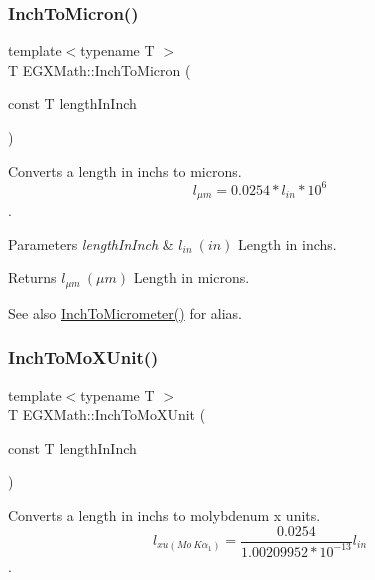 \subsubsection{\texorpdfstring{Inch\+To\+Micron()}{InchToMicron()}}
{\footnotesize\ttfamily template$<$typename T $>$ \\
T E\+G\+X\+Math\+::\+Inch\+To\+Micron (\begin{DoxyParamCaption}\item[{const T}]{length\+In\+Inch }\end{DoxyParamCaption})}



Converts a length in inchs to microns. \[ l_{\mu m}=0.0254 * l_{in} * 10^{6} \]. 


\begin{DoxyParams}{Parameters}
{\em length\+In\+Inch} & $ l_{in}\ (in)$ Length in inchs. \\
\hline
\end{DoxyParams}
\begin{DoxyReturn}{Returns}
$ l_{\mu m}\ (\mu m)$ Length in microns. 
\end{DoxyReturn}
\begin{DoxySeeAlso}{See also}
\mbox{\hyperlink{group___e_g_x_math-_conversions-_length_conversions-_imperial-_inch-_s_i_ga664100ea5f92f4e92686e217e996b475}{Inch\+To\+Micrometer()}} for alias. 
\end{DoxySeeAlso}
\mbox{\label{group___e_g_x_math-_conversions-_length_conversions-_imperial-_inch-_non-_s_i_ga938a029b99c57c1b765ebf23e82dee6e}} 
\subsubsection{\texorpdfstring{Inch\+To\+Mo\+X\+Unit()}{InchToMoXUnit()}}
{\footnotesize\ttfamily template$<$typename T $>$ \\
T E\+G\+X\+Math\+::\+Inch\+To\+Mo\+X\+Unit (\begin{DoxyParamCaption}\item[{const T}]{length\+In\+Inch }\end{DoxyParamCaption})}



Converts a length in inchs to molybdenum x units. \[ l_{xu(Mo\ K\alpha_1)}=\frac{0.0254}{1.00209952*10^{-13}} l_{in}\]. 


